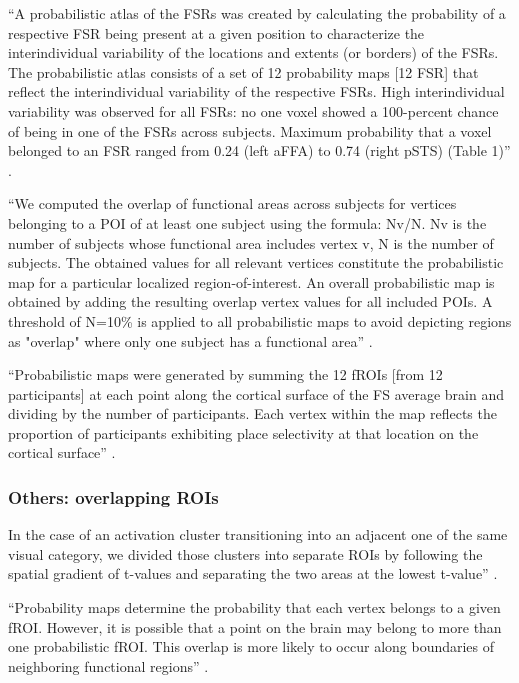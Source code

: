 %
``A probabilistic atlas of the FSRs was created by calculating the probability
of a respective FSR being present at a given position to characterize the
interindividual variability of the locations and extents (or borders) of the
FSRs.
%
The probabilistic atlas consists of a set of 12 probability maps [12 FSR] that
reflect the interindividual variability of the respective FSRs.
%
High interindividual variability was observed for all FSRs: no one voxel showed
a 100-percent chance of being in one of the FSRs across subjects.
%
Maximum probability that a voxel belonged to an FSR ranged from 0.24 (left aFFA)
to 0.74 (right pSTS) (Table 1)'' \citet{zhen2015quantifying}.



%
``We computed the overlap of functional areas across subjects for vertices
belonging to a POI of at least one subject using the formula: Nv/N.
%
Nv is the number of subjects whose functional area includes vertex v,
%
N is the number of subjects.
%
The obtained values for all relevant vertices constitute the probabilistic map
for a particular localized region-of-interest.
%
An overall probabilistic map is obtained by adding the resulting overlap vertex
values for all included POIs.
%
A threshold of N=10\% is applied to all probabilistic maps to avoid depicting
regions as "overlap" where only one subject has a functional area''
\citep{frost2012measuring}.


``Probabilistic maps were generated by summing the 12 fROIs [from 12
participants] at each point along the cortical surface of the FS average brain
and dividing by the number of participants.
%
Each vertex within the map reflects the proportion of participants exhibiting
place selectivity at that location on the cortical surface''
\citep{weiner2018defining}.





\subsubsection{Others: overlapping ROIs}

%
In the case of an activation cluster transitioning into an adjacent one of the
same visual category, we divided those clusters into separate ROIs by following
the spatial gradient of t-values and separating the two areas at the lowest
t-value'' \citep{rosenke2021probabilistic}.


%
``Probability maps determine the probability that each vertex belongs to a
given fROI.
%
However, it is possible that a point on the brain may belong to more than one
probabilistic fROI.
%
This overlap is more likely to occur along boundaries of neighboring functional
regions'' \citep{rosenke2021probabilistic}.

